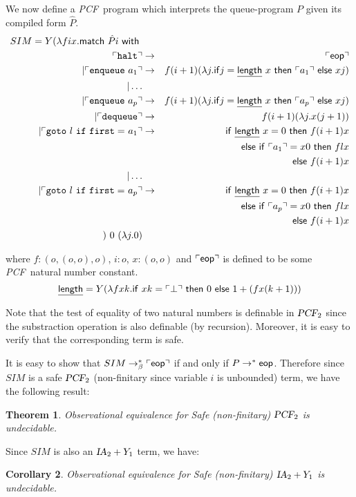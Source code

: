 \documentclass{article}
\newtheorem{theorem}{Theorem}[section]
\newtheorem{corollary}[theorem]{Corollary}
\newcommand{\encode}[1]{\ulcorner #1 \urcorner}
\newcommand\eop{{\sf eop}}
\newcommand{\betared}{\rightarrow_\beta}
\newcommand\ialgol{{\textsl{IA}}}
\newcommand\pcf{\textsl{PCF}}
\begin{document}
We now define a \pcf\ program which interprets the queue-program $P$ given  its compiled form $\hat{P}$.
\begin{eqnarray*}
SIM = Y ( \lambda f i x . {\sf match\ } \hat{P} i  {\sf \ with\ }   \\
 \encode{ \tt halt }&\rightarrow& \encode{\eop} \\
| \encode{ {\tt enqueue\ } a_1 } &\rightarrow& f (i+1) ( \lambda j . {\sf if} j = \underline{\sf length}\ x\ {\sf then\ } \encode{a_1} {\sf\ else\ } x j ) \\
| \ldots \\
| \encode{ {\tt enqueue\ } a_p } &\rightarrow& f (i+1) ( \lambda j . {\sf if} j = \underline{\sf length}\ x\ {\sf then\ } \encode{a_p} {\sf\ else\ } x j ) \\
| \encode{ {\tt dequeue } } &\rightarrow& f (i+1) (\lambda j . x (j+1) ) \\
| \encode{ {\tt goto\ } l {\tt\ if\ first=\ } a_1 } &\rightarrow&  
{\sf if\ } \underline{\sf length}\ x = 0 {\ \sf then\ } f (i+1) x \\
&&{\sf else\ if\ } \encode{a_1} = x 0 {\sf\ then\ } f l x \\
&&{\sf else\ } f (i+1) x \\
| \ldots \\
| \encode{{\tt goto\ } l {\tt\ if\ first=\ } a_p} &\rightarrow&  
{\sf if\ } \underline{\sf length}\ x = 0 {\ \sf then\ } f (i+1) x \\
&&{\sf else\ if\ } \encode{a_p} = x 0 {\sf\ then\ } f l x \\
&&{\sf else\ } f (i+1) x \\
)\ 0\ (\lambda j . 0)
\end{eqnarray*}

where $f: (o,(o,o),o)$, $i:o$, $x:(o,o)$ and $\encode{\eop}$ is defined to be some \pcf\ natural number constant.
$$ \underline{\sf  length}  = Y( \lambda f x k . {\sf if\ } x k = \encode{\bot} {\sf\ then\ } 0 {\sf\ else\ } 1 + (f x (k+1)))$$

Note that the test of equality of two natural numbers is definable in $\pcf_2$ since the substraction operation is  also definable (by recursion). Moreover, it is easy to verify that the corresponding term is safe.


It is easy to show that $SIM \betared^* \encode{\eop}$ if and only if $P \rightarrow^* \eop$. Therefore since $SIM$ is a safe $\pcf_2$ 
(non-finitary since variable $i$ is unbounded) term, we have the following result:
\begin{theorem}
Observational equivalence for Safe (non-finitary) $\pcf_2$ is undecidable.
\end{theorem}
Since $SIM$ is also an $\ialgol_2 + Y_1$ term, we have:
\begin{corollary}
Observational equivalence for Safe (non-finitary) $\ialgol_2 + Y_1$ is undecidable.
\end{corollary}
\end{document}
